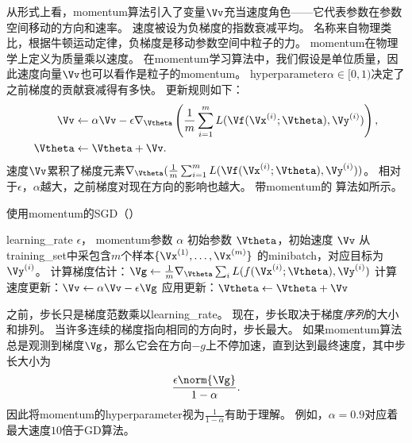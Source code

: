
从形式上看，\gls{momentum}算法引入了变量$\Vv$充当速度角色——它代表参数在参数空间移动的方向和速率。
速度被设为负梯度的指数衰减平均。
名称来自物理类比，根据牛顿运动定律，负梯度是移动参数空间中粒子的力。
\gls{momentum}在物理学上定义为质量乘以速度。
在\gls{momentum}学习算法中，我们假设是单位质量，因此速度向量$\Vv$也可以看作是粒子的\gls{momentum}。
\gls{hyperparameter}$\alpha\in[0,1)$决定了之前梯度的贡献衰减得有多快。
更新规则如下：
\begin{align}
\Vv & \leftarrow \alpha \Vv - \epsilon \nabla_{\Vtheta} \left( \frac{1}{m} \sum_{i=1}^m  L(\Vf(\Vx^{(i)}; \Vtheta), \Vy^{(i)}   )  \right), \\
\Vtheta & \leftarrow \Vtheta  + \Vv .
\end{align}
速度$\Vv$累积了梯度元素$\nabla_{\Vtheta}( \frac{1}{m} \sum_{i=1}^m L( \Vf(\Vx^{(i)}; \Vtheta), \Vy^{(i)} )  )$。
相对于$\epsilon$，$\alpha$越大，之前梯度对现在方向的影响也越大。
带\gls{momentum}的\,\,算法如所示。



\begin{algorithm}[ht]
\caption{使用\gls{momentum}的\gls{SGD}（）}
\label{alg:momentum}
\begin{algorithmic}
\REQUIRE \gls{learning_rate} $\epsilon$， \gls{momentum}参数 $\alpha$
\REQUIRE 初始参数 $\Vtheta$，初始速度 $\Vv$
    \STATE 从\gls{training_set}中采包含$m$个样本$\{ \Vx^{(1)},\dots, \Vx^{(m)}\}$ 的\gls{minibatch}，对应目标为$\Vy^{(i)}$。
    \STATE 计算梯度估计：$\Vg \leftarrow 
         \frac{1}{m} \nabla_{\Vtheta} \sum_i L(f(\Vx^{(i)};\Vtheta),\Vy^{(i)})$
    \STATE  计算速度更新：$\Vv \leftarrow \alpha \Vv - 
    \epsilon \Vg$
    \STATE 应用更新：$\Vtheta \leftarrow \Vtheta + \Vv$ 
\ENDWHILE
\end{algorithmic}
\end{algorithm}



之前，步长只是梯度范数乘以\gls{learning_rate}。
现在，步长取决于梯度\emph{序列}的大小和排列。
当许多连续的梯度指向相同的方向时，步长最大。
如果\gls{momentum}算法总是观测到梯度$\Vg$，那么它会在方向$-g$上不停加速，直到达到最终速度，其中步长大小为
\begin{equation}
    \frac{\epsilon \norm{\Vg}}{1-\alpha} .
\end{equation}
因此将\gls{momentum}的\gls{hyperparameter}视为$\frac{1}{1-\alpha}$有助于理解。
例如，$\alpha=0.9$对应着最大速度$10$倍于\gls{GD}算法。

